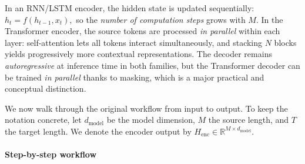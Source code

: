 \noindent
In an RNN/LSTM encoder, the hidden state is updated sequentially:
\(
h_t = f(h_{t-1}, x_t),
\)
so the \emph{number of computation steps} grows with \(M\).
In the Transformer encoder, the source tokens are processed \emph{in parallel} within each layer:
self-attention lets all tokens interact simultaneously,
and stacking \(N\) blocks yields progressively more contextual representations.
The decoder remains \emph{autoregressive} at inference time in both families,
but the Transformer decoder can be trained \emph{in parallel} thanks to masking, which is a major practical and conceptual distinction.

\noindent
We now walk through the original workflow from input to output.
To keep the notation concrete, let \(d_{\text{model}}\) be the model dimension,
\(M\) the source length, and \(T\) the target length.
We denote the encoder output by
\(
H_{\text{enc}} \in \mathbb{R}^{M \times d_{\text{model}}}.
\)

\paragraph{Step-by-step workflow}


